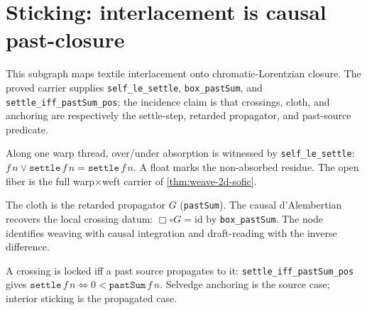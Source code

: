 \section{Sticking: interlacement is causal past-closure}

This subgraph maps textile interlacement onto chromatic-Lorentzian closure.  The
proved carrier supplies \texttt{self\_le\_settle},
\texttt{box\_pastSum}, and \texttt{settle\_iff\_pastSum\_pos}; the incidence
claim is that crossings, cloth, and anchoring are respectively the settle-step,
retarded propagator, and past-source predicate.

\begin{theorem}\label{thm:interlacement-is-settle}\leanok{}
Along one warp thread, over/under absorption is witnessed by
\texttt{self\_le\_settle}: $f\,n \lor \texttt{settle}\,f\,n =
\texttt{settle}\,f\,n$.  A float marks the non-absorbed residue.  The open fiber is
the full warp$\times$weft carrier of \cref{thm:weave-2d-sofic}.
\end{theorem}

\begin{theorem}\label{thm:fabric-is-propagator}\leanok{}
The cloth is the retarded propagator $G$ (\texttt{pastSum}).  The causal
d'Alembertian recovers the local crossing datum:
$\Box\circ G=\mathrm{id}$ by \texttt{box\_pastSum}.  The node identifies weaving
with causal integration and draft-reading with the inverse difference.
\end{theorem}

\begin{theorem}\label{thm:stick-iff-past-source}\leanok{}
A crossing is locked iff a past source propagates to it:
\texttt{settle\_iff\_pastSum\_pos} gives
$\texttt{settle}\,f\,n \iff 0<\texttt{pastSum}\,f\,n$.  Selvedge anchoring is the
source case; interior sticking is the propagated case.
\end{theorem}
